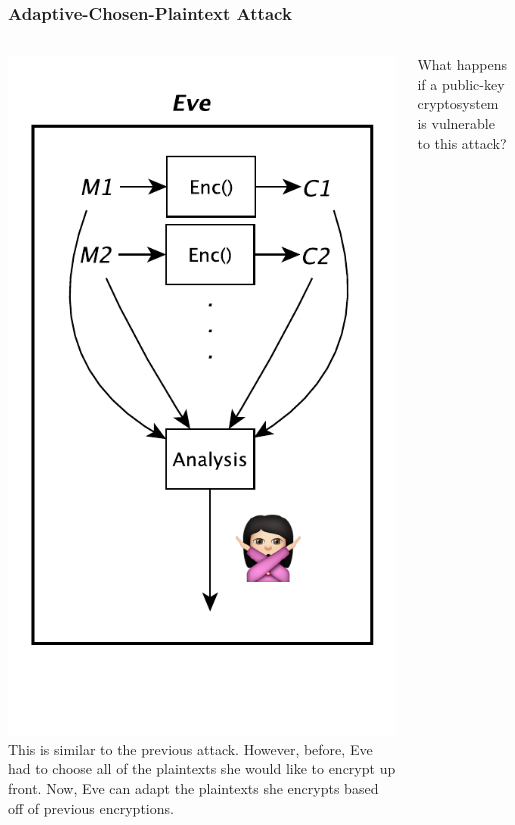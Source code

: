 \documentclass{beamer}
\newcommand{\<}{\langle}
\renewcommand{\>}{\rangle}
\begin{document}
\begin{frame}
\frametitle{Adaptive-Chosen-Plaintext Attack}

\begin{columns}
\centering
\includegraphics[scale=.5]{IMG/attack3.pdf}
This is similar to the previous attack. However, before, Eve had to choose all of the plaintexts she would like to encrypt up front. Now, Eve can adapt the plaintexts she encrypts based off of previous encryptions. \newline

What happens if a public-key cryptosystem is vulnerable to this attack?
\end{columns} 
\end{frame}
\end{document}
